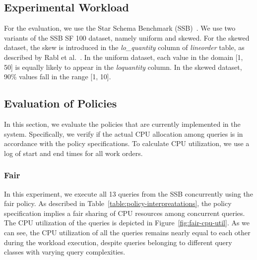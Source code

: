 
\subsection{Experimental Workload}\label{ssec:workload}
For the evaluation, we use the Star Schema Benchmark (SSB)~\cite{ssb}. 
We use two variants of the SSB SF 100 dataset, namely uniform and skewed. 
For the skewed dataset, the skew is introduced in the \textit{lo\_quantity} column of \textit{lineorder} table, as described by Rabl et al.~\cite{DBLP:conf/wosp/RablPJOO13}.
In the uniform dataset, each value in the domain [1, 50] is equally likely to appear in the \textit{lo\textunderscore quantity} column.
In the skewed dataset, 90\% values fall in the range [1, 10]. 

\subsection{Evaluation of Policies}\label{ssec:policy-eval}
In this section, we evaluate the policies that are currently implemented in the system.
Specifically, we verify if the actual CPU allocation among queries is in accordance with the policy specifications.
To calculate CPU utilization, we use a log of start and end times for all work orders. %

\subsubsection{Fair}
In this experiment, we execute all 13 queries from the SSB concurrently using the fair policy. 
As described in Table~\ref{table:policy-interpreatations}, the policy specification implies a fair sharing of CPU resources among concurrent queries.
The CPU utilization of the queries is depicted in Figure~\ref{fig:fair-cpu-util}.
As we can see, the CPU utilization of all the queries remains nearly equal to each other during the workload execution, despite queries belonging to different query classes with varying query complexities.

